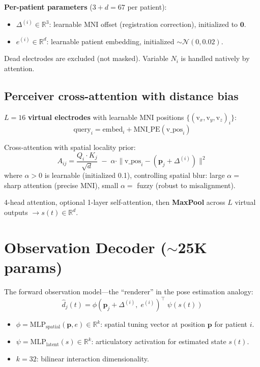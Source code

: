 \documentclass[11pt,letterpaper]{article}
\newcommand{\bfp}{\mathbf{p}}
\newcommand{\R}{\mathbb{R}}
\begin{document}
\textbf{Per-patient parameters} ($3 + d = 67$ per patient):
\begin{itemize}[leftmargin=2em]
\item $\Delta^{(i)} \in \R^3$: learnable MNI offset (registration correction), initialized to $\mathbf{0}$.
\item $e^{(i)} \in \R^d$: learnable patient embedding, initialized $\sim \mathcal{N}(0, 0.02)$.
\end{itemize}

Dead electrodes are excluded (not masked). Variable $N_i$ is handled natively by attention.

\subsection{Perceiver cross-attention with distance bias}

$L = 16$ \textbf{virtual electrodes} with learnable MNI positions $\{(\text{v}_x, \text{v}_y, \text{v}_z)_i\}$:
\begin{equation}
\text{query}_i = \text{embed}_i + \text{MNI\_PE}(\text{v\_pos}_i)
\end{equation}

Cross-attention with spatial locality prior:
\begin{equation}
A_{ij} = \frac{Q_i \cdot K_j}{\sqrt{d}} \;-\; \alpha \cdot \|\text{v\_pos}_i - (\bfp_j + \Delta^{(i)})\|^2
\end{equation}
where $\alpha > 0$ is learnable (initialized 0.1), controlling spatial blur: large $\alpha =$ sharp attention (precise MNI), small $\alpha =$ fuzzy (robust to misalignment).

4-head attention, optional 1-layer self-attention, then \textbf{MaxPool} across $L$ virtual outputs $\to s(t) \in \R^d$.


\section{Observation Decoder (${\sim}$25K params)}\label{sec:obs-decoder}

The forward observation model---the ``renderer'' in the pose estimation analogy:
\begin{equation}\label{eq:bilinear}
\boxed{\hat{d}_j(t) = \phi(\bfp_j + \Delta^{(i)},\; e^{(i)})^\top \;\psi(s(t))}
\end{equation}
\begin{itemize}[leftmargin=2em]
\item $\phi = \text{MLP}_{\text{spatial}}(\bfp, e) \in \R^k$: spatial tuning vector at position $\bfp$ for patient $i$.
\item $\psi = \text{MLP}_{\text{latent}}(s) \in \R^k$: articulatory activation for estimated state $s(t)$.
\item $k = 32$: bilinear interaction dimensionality.
\end{itemize}
\end{document}

